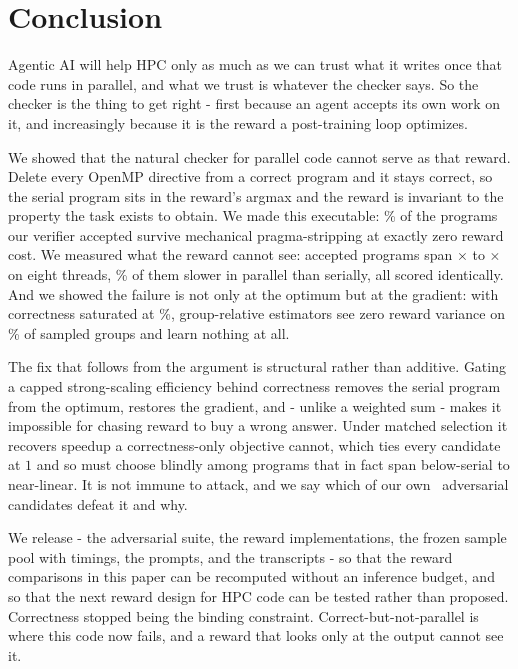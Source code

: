 \section{Conclusion}
\label{sec:conclusion}

Agentic AI will help HPC only as much as we can trust what it writes once that
code runs in parallel, and what we trust is whatever the checker says. So the
checker is the thing to get right - first because an agent accepts its own work
on it, and increasingly because it is the reward a post-training loop
optimizes.

We showed that the natural checker for parallel code cannot serve as that
reward. Delete every OpenMP directive from a correct program and it stays
correct, so the serial program sits in the reward's argmax and the reward is
invariant to the property the task exists to obtain. We made this executable:
\SPRate\% of the programs our verifier accepted survive mechanical
pragma-stripping at exactly zero reward cost. We measured what the reward
cannot see: accepted programs span \SpeedMin$\times$ to \SpeedMax$\times$ on
eight threads, \BelowSerialRate\% of them slower in parallel than serially, all
scored identically. And we showed the failure is not only at the optimum but at
the gradient: with correctness saturated at \PassRate\%, group-relative
estimators see zero reward variance on \DeadGroupCorrEight\% of sampled groups
and learn nothing at all.

The fix that follows from the argument is structural rather than additive.
Gating a capped strong-scaling efficiency behind correctness removes the serial
program from the optimum, restores the gradient, and - unlike a weighted
sum - makes it impossible for chasing reward to buy a wrong answer. Under
matched selection it recovers speedup a correctness-only objective cannot,
which ties every candidate at $1$ and so must choose blindly among programs that
in fact span below-serial to near-linear. It is not immune to attack, and we say which
of our own \NHacks\ adversarial candidates defeat it and why.

We release \PG - the adversarial suite, the reward implementations, the frozen
sample pool with timings, the prompts, and the transcripts - so that the reward
comparisons in this paper can be recomputed without an inference budget, and so
that the next reward design for HPC code can be tested rather than proposed.
Correctness stopped being the binding constraint. Correct-but-not-parallel is
where this code now fails, and a reward that looks only at the output cannot
see it.
